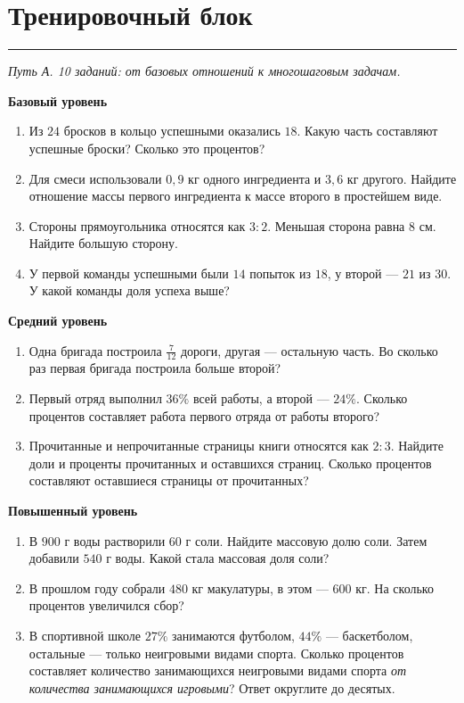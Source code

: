 \documentclass[a4paper,12pt]{article}
\newcommand{\partsection}[1]{\vspace{10pt}\section*{\textcolor{tealdark}{#1}}\vspace{-2pt}\noindent\textcolor{tealblue}{\rule{\linewidth}{0.5pt}}\vspace{3pt}}
\begin{document}
\partsection{Тренировочный блок}
\textit{Путь А. 10 заданий: от базовых отношений к многошаговым задачам.}\par
\textbf{Базовый уровень}
\begin{enumerate}[label=\textbf{\arabic*.},itemsep=10pt]
\item Из $24$ бросков в кольцо успешными оказались $18$. Какую часть составляют успешные броски? Сколько это процентов?
\item Для смеси использовали $0{,}9$ кг одного ингредиента и $3{,}6$ кг другого. Найдите отношение массы первого ингредиента к массе второго в простейшем виде.
\item Стороны прямоугольника относятся как $3:2$. Меньшая сторона равна $8$ см. Найдите большую сторону.
\item У первой команды успешными были $14$ попыток из $18$, у второй --- $21$ из $30$. У какой команды доля успеха выше?
\end{enumerate}
\textbf{Средний уровень}
\begin{enumerate}[label=\textbf{\arabic*.},start=5,itemsep=10pt]
\item Одна бригада построила $\tfrac7{12}$ дороги, другая --- остальную часть. Во сколько раз первая бригада построила больше второй?
\item Первый отряд выполнил $36\%$ всей работы, а второй --- $24\%$. Сколько процентов составляет работа первого отряда от работы второго?
\item Прочитанные и непрочитанные страницы книги относятся как $2:3$. Найдите доли и проценты прочитанных и оставшихся страниц. Сколько процентов составляют оставшиеся страницы от прочитанных?
\end{enumerate}
\textbf{Повышенный уровень}
\begin{enumerate}[label=\textbf{\arabic*.},start=8,itemsep=10pt]
\item В $900$ г воды растворили $60$ г соли. Найдите массовую долю соли. Затем добавили $540$ г воды. Какой стала массовая доля соли?
\item В прошлом году собрали $480$ кг макулатуры, в этом --- $600$ кг. На сколько процентов увеличился сбор?
\item В спортивной школе $27\%$ занимаются футболом, $44\%$ --- баскетболом, остальные --- только неигровыми видами спорта. Сколько процентов составляет количество занимающихся неигровыми видами спорта \emph{от количества занимающихся игровыми}? Ответ округлите до десятых.
\end{enumerate}
\end{document}
